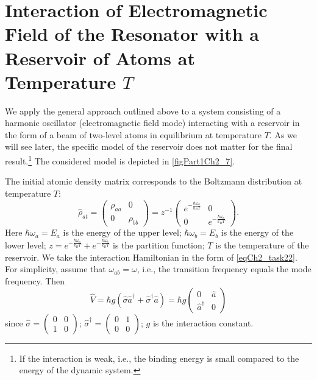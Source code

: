 \section{Interaction of Electromagnetic Field of the Resonator with a Reservoir of Atoms at Temperature $T$}
\label{ch2_6}
We apply the general approach outlined above to a system consisting of a harmonic oscillator (electromagnetic field mode) interacting with a reservoir in the form of a beam of two-level atoms in equilibrium at temperature $T$. As we will see later, the specific model of the reservoir does not matter for the final result.\footnote{If the interaction is weak, i.e., the binding energy is small compared to the energy of the dynamic system.} The considered model is depicted in \autoref{figPart1Ch2_7}.  



The initial atomic density matrix  corresponds to the Boltzmann distribution at temperature $T$:  
\begin{equation}
\hat{\rho}_{at} = 
\left(
\begin{array} {cc}
\rho_{aa} & 0  
\\
0 & \rho_{bb} 
\end{array}
\right)
=
z^{-1}
\left(
\begin{array} {cc}
e^{-\frac{\hbar \omega_a}{k_B T}} & 0  
\\
0 & e^{-\frac{\hbar \omega_b}{k_B T}} 
\end{array}
\right).
\end{equation}
Here $\hbar \omega_a = E_a$ is the energy of the upper level;  
$\hbar \omega_b = E_b$ is the energy of the lower level; 
$z = e^{-\frac{\hbar \omega_a}{k_B T}} + e^{-\frac{\hbar \omega_b}{k_B T}}$ is the partition function; $T$ is the temperature of the reservoir. 
We take the interaction Hamiltonian in the form of \eqref{eqCh2_task22}. For simplicity, assume that $\omega_{ab} = \omega$, i.e., the transition frequency equals the mode frequency. Then  
\begin{equation}
\hat{V} = \hbar g \left(\hat{\sigma}\hat{a}^{\dag} + 
\hat{\sigma}^{\dag}\hat{a} \right)= 
\hbar g 
\left(
\begin{array} {cc}
0 & \hat{a}  
\\
\hat{a}^{\dag} & 0 
\end{array}
\right)
\end{equation}
since  
\(
\hat{\sigma} = 
\left(
\begin{array} {cc}
0 & 0  
\\
1 & 0 
\end{array}
\right)
\);
\(
\hat{\sigma}^{\dag} = 
\left(
\begin{array} {cc}
0 & 1  
\\
0 & 0 
\end{array}
\right)
\); $g$ is the interaction constant. 

